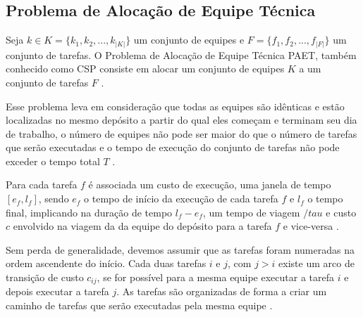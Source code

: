 


\subsection{Problema de Alocação de Equipe Técnica}
Seja $k \in K=\{k_1, k_2, ..., k_{|K|}\}$ um conjunto de equipes e $F = \{f_1, f_2, ..., f_{|F|}\}$ um conjunto de tarefas. O Problema de Alocação de Equipe Técnica \ac{PAET}, também conhecido como \ac{CSP} consiste em alocar um conjunto de equipes $K$ a um conjunto de tarefas $F$ \cite{Beasley:1996}. 

Esse problema leva em consideração que todas as equipes são idênticas e estão localizadas no mesmo depósito a partir do qual eles começam e terminam seu dia de trabalho, o número de equipes não pode ser maior do que o número de tarefas que serão executadas e o tempo de execução do conjunto de tarefas não pode exceder o tempo total $T$ \cite{Beasley:1996}.

Para cada tarefa $f$ é associada um custo de execução, uma janela de tempo $[e_f, l_f]$, sendo $e_f$ o tempo de início da execução de cada tarefa $f$ e $l_f$ o tempo final, implicando na duração de tempo $l_f - e_f$, um tempo de viagem $/tau$ e custo $c$ envolvido na viagem da da equipe do depósito para a tarefa $f$ e vice-versa \cite{Beasley:1996}.

Sem perda de generalidade, devemos assumir que as tarefas foram numeradas na ordem ascendente do início. Cada duas tarefas $i$ e $j$, com $j > i$ existe um arco de transição de custo $c_{ij}$, se for possível para a mesma equipe executar a tarefa $i$ e depois executar a tarefa $j$. As tarefas são organizadas de forma a criar um caminho de tarefas que serão executadas pela mesma equipe \cite{Beasley:1996}. 

